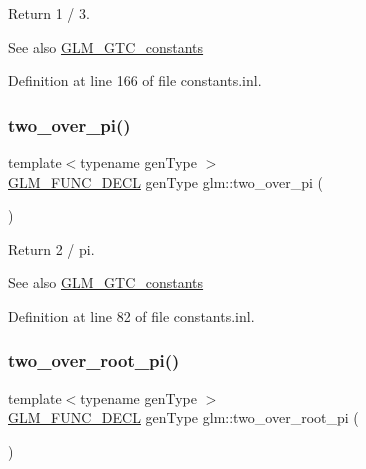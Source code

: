 Return 1 / 3. \begin{DoxySeeAlso}{See also}
\hyperlink{group__gtc__constants}{G\+L\+M\+\_\+\+G\+T\+C\+\_\+constants} 
\end{DoxySeeAlso}


Definition at line 166 of file constants.\+inl.

\mbox{\label{group__gtc__constants_ga85729d38c47351686e8659f80447a7ea}} 
\subsubsection{\texorpdfstring{two\+\_\+over\+\_\+pi()}{two\_over\_pi()}}
{\footnotesize\ttfamily template$<$typename gen\+Type $>$ \\
\hyperlink{setup_8hpp_ab2d052de21a70539923e9bcbf6e83a51}{G\+L\+M\+\_\+\+F\+U\+N\+C\+\_\+\+D\+E\+CL} gen\+Type glm\+::two\+\_\+over\+\_\+pi (\begin{DoxyParamCaption}{ }\end{DoxyParamCaption})}

Return 2 / pi. \begin{DoxySeeAlso}{See also}
\hyperlink{group__gtc__constants}{G\+L\+M\+\_\+\+G\+T\+C\+\_\+constants} 
\end{DoxySeeAlso}


Definition at line 82 of file constants.\+inl.

\mbox{\label{group__gtc__constants_ga767e539c20585bf60aa63595b0f0b259}} 
\subsubsection{\texorpdfstring{two\+\_\+over\+\_\+root\+\_\+pi()}{two\_over\_root\_pi()}}
{\footnotesize\ttfamily template$<$typename gen\+Type $>$ \\
\hyperlink{setup_8hpp_ab2d052de21a70539923e9bcbf6e83a51}{G\+L\+M\+\_\+\+F\+U\+N\+C\+\_\+\+D\+E\+CL} gen\+Type glm\+::two\+\_\+over\+\_\+root\+\_\+pi (\begin{DoxyParamCaption}{ }\end{DoxyParamCaption})}

